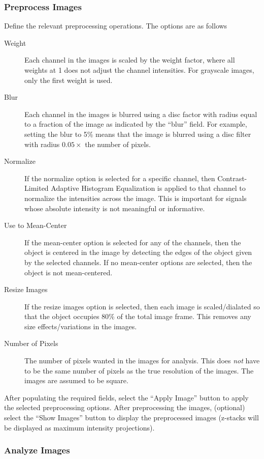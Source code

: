 \documentclass[12pt]{article}
\begin{document}
\subsubsection{Preprocess Images}

Define the relevant preprocessing operations. 
%
The options are as follows
%
\begin{description}
\item[Weight] Each channel in the images is scaled by the weight factor, where all weights at 1 does not adjust the channel intensities. For grayscale images, only the first weight is used. 
%
\item[Blur] Each channel in the images is blurred using a disc factor with radius equal to a fraction of the image as indicated by the ``blur'' field. For example, setting the blur to 5\% means that the image is blurred using a disc filter with radius $0.05 \times$ the number of pixels. 
%
\item[Normalize] If the normalize option is selected for a specific channel, then Contrast-Limited Adaptive Histogram Equalization is applied to that channel to normalize the intensities across the image. This is important for signals whose absolute intensity is not meaningful or informative. 
%
\item[Use to Mean-Center] If the mean-center option is selected for any of the channels, then the object is centered in the image by detecting the edges of the object given by the selected channels. If no mean-center options are selected, then the object is not mean-centered.
%
\item[Resize Images] If the resize images option is selected, then each image is scaled/dialated so that the object occupies 80\% of the total image frame. This removes any size effects/variations in the images. 
%
\item[Number of Pixels] The number of pixels wanted in the images for analysis. This does {\em not} have to be the same number of pixels as the true resolution of the images. The images are assumed to be square. 
%
\end{description}

After populating the required fields, select the ``Apply Image'' button to apply the selected preprocessing options.
%
After preprocessing the images, (optional) select the ``Show Images'' button to display the preprocessed images (z-stacks will be displayed as maximum intensity projections).

\subsubsection{Analyze Images}
\end{document}
